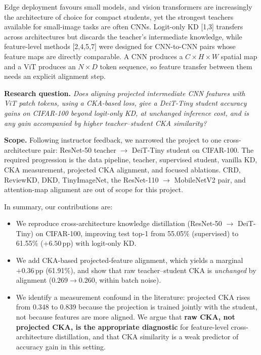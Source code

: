 \documentclass[11pt, letterpaper]{article}
\begin{document}
Edge deployment favours small models, and vision transformers are increasingly
the architecture of choice for compact students, yet the strongest teachers
available for small-image tasks are often CNNs. Logit-only KD [1,3] transfers
across architectures but discards the teacher's intermediate knowledge, while
feature-level methods [2,4,5,7] were designed for CNN-to-CNN pairs whose
feature maps are directly comparable. A CNN produces a $C\times H\times W$
spatial map and a ViT produces an $N\times D$ token sequence, so feature
transfer between them needs an explicit alignment step.

\textbf{Research question.} \emph{Does aligning projected intermediate CNN
features with ViT patch tokens, using a CKA-based loss, give a DeiT-Tiny
student accuracy gains on CIFAR-100 beyond logit-only KD, at unchanged
inference cost, and is any gain accompanied by higher teacher--student CKA
similarity?}

\textbf{Scope.} Following instructor feedback, we
narrowed the project to one cross-architecture pair: ResNet-50 teacher
$\rightarrow$ DeiT-Tiny student on CIFAR-100. The required progression is the
data pipeline, teacher, supervised student, vanilla KD, CKA measurement,
projected CKA alignment, and focused ablations. CRD, ReviewKD, DKD,
TinyImageNet, the ResNet-110 $\rightarrow$ MobileNetV2 pair, and attention-map
alignment are out of scope for this project.

In summary, our contributions are:
\begin{itemize}[noitemsep]
  \item We reproduce cross-architecture knowledge distillation
    (ResNet-50 $\rightarrow$ DeiT-Tiny) on CIFAR-100, improving test top-1
    from 55.05\% (supervised) to 61.55\% ($+6.50$\,pp) with logit-only KD.
  \item We add CKA-based projected-feature alignment, which yields a
    marginal $+0.36$\,pp (61.91\%), and show that raw teacher--student CKA
    is \emph{unchanged} by alignment ($0.269 \to 0.260$, within batch noise).
  \item We identify a measurement confound in the literature: projected CKA
    rises from 0.348 to 0.839 because the projection is trained jointly with
    the student, not because features are more aligned. We argue that
    \textbf{raw CKA, not projected CKA, is the appropriate diagnostic} for
    feature-level cross-architecture distillation, and that CKA similarity is
    a weak predictor of accuracy gain in this setting.
\end{itemize}
\end{document}
